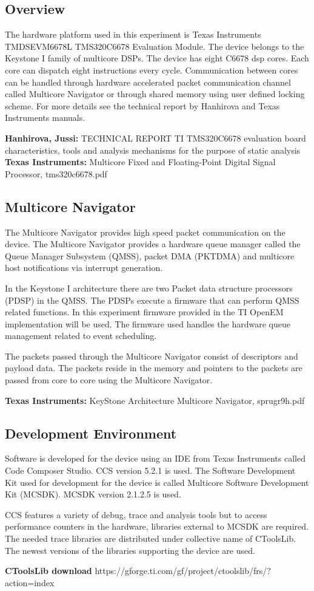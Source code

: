 \subsection{Overview}
The hardware platform used in this experiment is Texas Instruments TMDSEVM6678L TMS320C6678 Evaluation Module. The device belongs to the Keystone I family of multicore DSPs. The device has eight C6678 dsp cores. Each core can dispatch eight instructions every cycle. Communication between cores can be handled through hardware accelerated packet communication channel called Multicore Navigator or through shared memory using user defined locking scheme. For more details see the technical report by Hanhirova and Texas Instruments manuals.

\textbf{Hanhirova, Jussi:} TECHNICAL REPORT TI TMS320C6678 evaluation board characteristics, tools and analysis mechanisms for the purpose of static analysis\\
\textbf{Texas Instruments:} Multicore Fixed and Floating-Point Digital Signal Processor, tms320c6678.pdf

\subsection{Multicore Navigator}\label{navigator}
The Multicore Navigator provides high speed packet communication on the device. The Multicore Navigator provides a hardware queue manager called the Queue Manager Subsystem (QMSS), packet DMA (PKTDMA) and multicore host notifications via interrupt generation.

In the Keystone I architecture there are two Packet data structure processors (PDSP) in the QMSS. The PDSPs execute a firmware that can perform QMSS related functions. In this experiment firmware provided in the TI OpenEM implementation will be used. The firmware used handles the hardware queue management related to event scheduling.

The packets passed through the Multicore Navigator consist of descriptors and payload data. The packets reside in the memory and pointers to the packets are passed from core to core using the Multicore Navigator.

\textbf{Texas Instruments:} KeyStone Architecture Multicore Navigator, sprugr9h.pdf

\subsection{Development Environment}\label{MCSDK}
Software is developed for the device using an IDE from Texas Instruments called Code Composer Studio. CCS version 5.2.1 is used. The Software Development Kit used for development for the device is called Multicore Software Development Kit (MCSDK). MCSDK version 2.1.2.5 is used.

CCS features a variety of debug, trace and analysis tools but to access performance counters in the hardware, libraries external to MCSDK are required. The needed trace libraries are distributed under collective name of CToolsLib. The newest versions of the libraries supporting the device are used.

\textbf{CToolsLib download} https://gforge.ti.com/gf/project/ctoolslib/frs/?action=index
